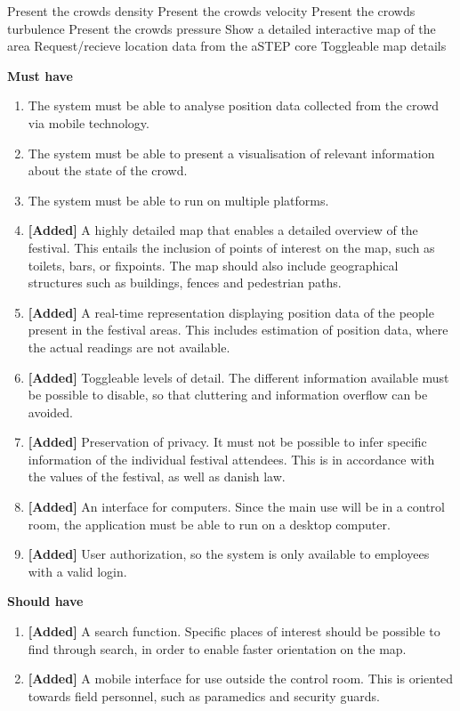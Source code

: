 Present the crowds density
Present the crowds velocity
Present the crowds turbulence
Present the crowds pressure
Show a detailed interactive map of the area
Request/recieve location data from the aSTEP core
Toggleable map details



\textbf{Must have}
\begin{enumerate}
    \item The system must be able to analyse position data collected from the crowd via mobile technology.
    \item The system must be able to present a visualisation of relevant information about the state of the crowd.
    \item The system must be able to run on multiple platforms.
    \item \textbf{[Added]} A highly detailed map that enables a detailed overview of the festival. This entails the inclusion of points of interest on the map, such as toilets, bars, or fixpoints. The map should also include geographical structures such as buildings, fences and pedestrian paths.
    \item \textbf{[Added]} A real-time representation displaying position data of the people present in the festival areas. This includes estimation of position data, where the actual readings are not available.
    \item \textbf{[Added]} Toggleable levels of detail. The different information available must be possible to disable, so that cluttering and information overflow can be avoided.
    \item \textbf{[Added]} Preservation of privacy. It must not be possible to infer specific information of the individual festival attendees. This is in accordance with the values of the festival, as well as danish law.
    \item \label{itm:desktop_req} \textbf{[Added]} An interface for computers. Since the main use will be in a control room, the application must be able to run on a desktop computer.
    \item \textbf{[Added]} User authorization, so the system is only available to employees with a valid login.
\end{enumerate}

\textbf{Should have}
\begin{enumerate}[resume]
    \item \textbf{[Added]} A search function. Specific places of interest should be possible to find through search, in order to enable faster orientation on the map.
    \item \label{itm:mobile_req} \textbf{[Added]} A mobile interface for use outside the control room. This is oriented towards field personnel, such as paramedics and security guards.
\end{enumerate}

